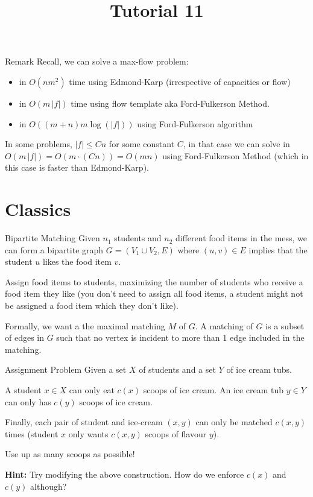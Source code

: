 \documentclass[aspectratio=169,11pt]{beamer}
\title{Tutorial 11}
\author{}
\date{}
\newcommand{\blankslides}{%
  \begin{frame}[plain]\end{frame}%
  \begin{frame}[plain]\end{frame}%
}
\begin{document}
\begin{frame}[plain]
  \titlepage
\end{frame}

\begin{frame}{Remark}
Recall, we can solve a max-flow problem:
\begin{itemize}
  \item in $O(nm^2)$ time using Edmond-Karp (irrespective of capacities or flow)
  \item in $O(m\,|f|)$ time using flow template aka Ford-Fulkerson Method.
  \item in $O((m+n)m\log(|f|))$ using Ford-Fulkerson algorithm
\end{itemize}
In some problems, $|f|\le Cn$ for some constant $C$, in that case we can solve in
$O(m\,|f|)=O(m\cdot(Cn))=O(mn)$ using Ford-Fulkerson Method (which in this case is faster than Edmond-Karp).
\end{frame}

\section{Classics}

\begin{frame}{Bipartite Matching}
Given $n_1$ students and $n_2$ different food items in the mess, we can form a bipartite graph
$G=(V_1\cup V_2,E)$ where $(u,v)\in E$ implies that the student $u$ likes the food item $v$.

\medskip
Assign food items to students, maximizing the number of students who receive a food item they like
(you don't need to assign all food items, a student might not be assigned a food item which they don't like).

\medskip
Formally, we want a the maximal matching $M$ of $G$. A matching of $G$ is a subset of edges in $G$
such that no vertex is incident to more than 1 edge included in the matching.
\end{frame}
\blankslides

\begin{frame}{Assignment Problem}
Given a set $X$ of students and a set $Y$ of ice cream tubs.

\medskip
A student $x\in X$ can only eat $c(x)$ scoops of ice cream. An ice cream tub $y\in Y$ can only has
$c(y)$ scoops of ice cream.

\medskip
Finally, each pair of student and ice-cream $(x,y)$ can only be matched $c(x,y)$ times
(student $x$ only wants $c(x,y)$ scoops of flavour $y$).

\medskip
Use up as many scoops as possible!

\medskip
\textbf{Hint:} Try modifying the above construction. How do we enforce $c(x)$ and $c(y)$ although?
\end{frame}
\blankslides
\end{document}

